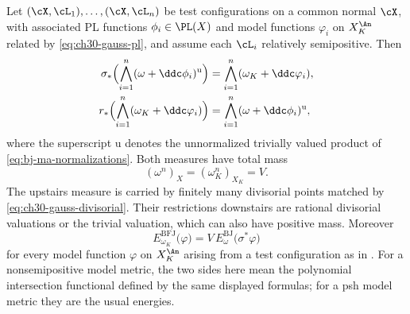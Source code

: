 \begin{theorem}
\label{thm:ch30-gauss-measures}
Let $(\cX,\cL_1),\ldots,(\cX,\cL_n)$ be test configurations on a common
normal $\cX$, with associated PL functions $\phi_i\in\PL(X)$ and model
functions $\varphi_i$ on $X_K^{\An}$ related by
\eqref{eq:ch30-gauss-pl}, and assume each $\cL_i$ relatively
semipositive.  Then
\begin{equation}
\label{eq:ch30-gauss-measure-transfer}
 \begin{aligned}
 \sigma_*\Bigl(\bigwedge_{i=1}^n(\omega+\ddc\phi_i)^{\mathrm u}\Bigr)
 &=\bigwedge_{i=1}^n(\omega_K+\ddc\varphi_i),\\
 r_*\Bigl(\bigwedge_{i=1}^n(\omega_K+\ddc\varphi_i)\Bigr)
 &=\bigwedge_{i=1}^n(\omega+\ddc\phi_i)^{\mathrm u},
 \end{aligned}
\end{equation}
where the superscript $\mathrm u$ denotes the unnormalized trivially
valued product of \eqref{eq:bj-ma-normalizations}.  Both measures have total
mass
\begin{equation}
\label{eq:ch30-gauss-mass}
 (\omega^n)_X=(\omega_K^n)_{X_K}=V.
\end{equation}
The upstairs measure is carried by finitely many divisorial points
matched by \eqref{eq:ch30-gauss-divisorial}.  Their restrictions
downstairs are rational divisorial valuations or the trivial valuation,
which can also have positive mass.  Moreover
\begin{equation}
\label{eq:ch30-gauss-energy}
 E^{\mathrm{BFJ}}_{\omega_K}\bigl(\varphi\bigr)
 =V\,E^{\mathrm{BJ}}_{\omega}\bigl(\sigma^*\varphi\bigr)
\end{equation}
for every model function $\varphi$ on $X_K^{\An}$ arising from a test
configuration as in .
For a nonsemipositive model metric, the two sides here mean the
polynomial intersection functional defined by the same displayed
formulas; for a psh model metric they are the usual energies.
\end{theorem}


